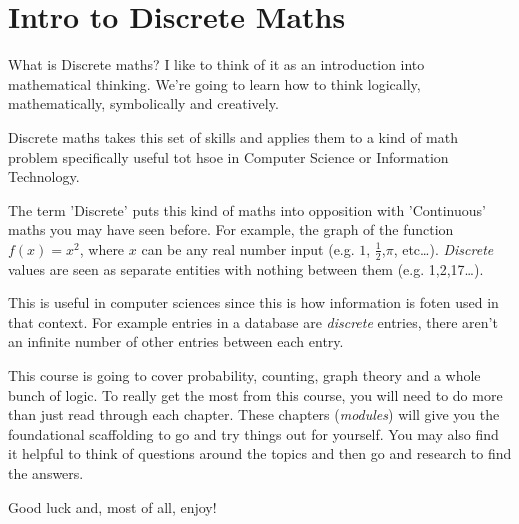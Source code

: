 \chapter{Intro to Discrete Maths}

What is Discrete maths? I like to think of it as an introduction into mathematical thinking. We're going to learn how to think logically, mathematically, symbolically and creatively.

Discrete maths takes this set of skills and applies them to a kind of math problem specifically useful tot hsoe in Computer Science or Information Technology.

The term 'Discrete' puts this kind of maths into opposition with 'Continuous' maths you may have seen before. For example, the graph of the function $f(x) = x^2$, where $x$ can be any real number input (e.g. $1$, $\frac{1}{2}$,$\pi$, etc\dots). \emph{Discrete} values are seen as separate entities with nothing between them (e.g. 1,2,17\dots).

This is useful in computer sciences since this is how information is foten used in that context. For example entries in a database are \emph{discrete} entries, there aren't an infinite number of other entries between each entry.

This course is going to cover probability, counting, graph theory and a whole bunch of logic. To really get the most from this course, you will need to do more than just read through each chapter. These chapters (\emph{modules}) will give you the foundational scaffolding to go and try things out for yourself. You may also find it helpful to think of questions around the topics and then go and research to find the answers.

Good luck and, most of all, enjoy!

